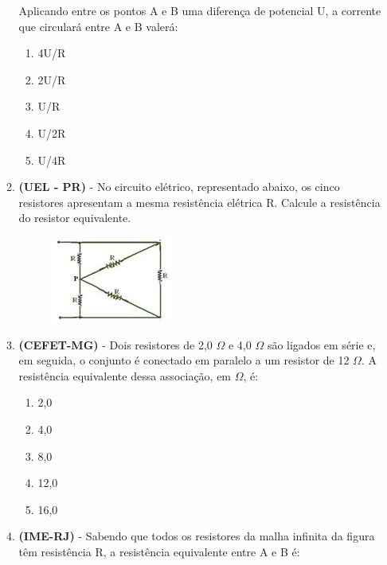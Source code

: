 \documentclass[12pt,letterpaper,fleqn]{article}
\begin{document}
\begin{itemize}
\begin{enumerate}
            Aplicando entre os pontos A e B uma diferença de potencial U, a corrente que circulará entre A e B valerá:
            \begin{enumerate}
                \item 4U/R
                \item 2U/R
                \item U/R
                \item U/2R
                \item U/4R
            \end{enumerate}
            
            \item \textbf{(UEL - PR)} - No circuito elétrico, representado abaixo, os cinco resistores  apresentam a mesma resistência elétrica R. Calcule a resistência do resistor equivalente.
            
            \begin{figure}[h]
                \centering
                \includegraphics{circuito_uel_36.jpg}
            \end{figure}
            
            \item \textbf{(CEFET-MG)} - Dois resistores de 2,0 $\Omega$ e 4,0 $\Omega$ são ligados em série e, em seguida, o conjunto é conectado em paralelo a um resistor de 12 $\Omega$. A resistência equivalente dessa associação, em $\Omega$, é:
            
            \begin{enumerate}
                \item 2,0
                \item 4,0
                \item 8,0
                \item 12,0
                \item 16,0
            \end{enumerate}
            
            \pagebreak
            \item \textbf{(IME-RJ)} - Sabendo que todos os resistores da malha infinita da figura têm resistência R, a resistência equivalente entre A e B é:
            

\end{enumerate}
\end{itemize}
\end{document}
